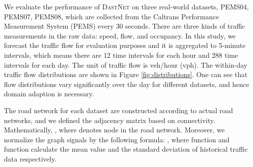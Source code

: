 \documentclass[sigconf]{acmart}
\theoremstyle{definition}
\begin{document}
We evaluate the performance of \textsc{DastNet} on three real-world datasets, PEMS04, PEMS07, PEMS08, which are collected from the Caltrans Performance Measurement System (PEMS) \cite{caltrans} every 30 seconds. There are three kinds of traffic measurements in the raw data: speed, flow, and occupancy. In this study, we forecast the traffic flow for evaluation purposes and it is aggregated to 5-minute intervals, which means there are 12 time intervals for each hour and 288 time intervals for each day. The unit of traffic flow is veh/hour (vph).
The within-day traffic flow distributions are shown in Figure \ref{fig:distributions}. One can see that flow distributions vary significantly over the day for different datasets, and hence domain adaption is necessary.


The road network for each dataset are constructed according to actual road networks, and we defined the adjacency matrix based on connectivity. Mathematically, , where  denotes node  in the road network. Moreover, we normalize the graph signals by the following formula: , where function  and function  calculate the mean value and the standard deviation of historical traffic data respectively.
\end{document}
